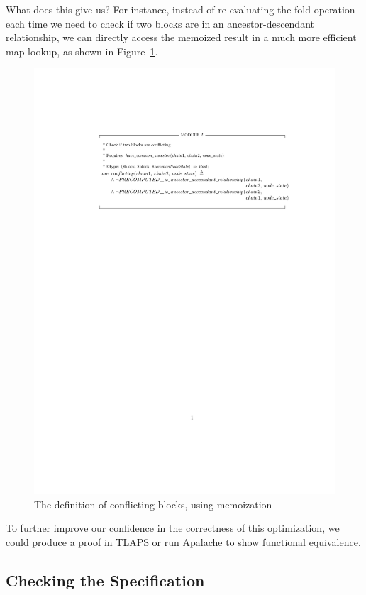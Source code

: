 What does this give us? For instance, instead of re-evaluating the fold
operation each time we need to check if two blocks are in an
ancestor-descendant relationship, we can directly access the memoized result in
a much more efficient map lookup, as shown in
Figure~\ref{fig:conflicting-memo}.

\begin{figure}[h]
  \includegraphics[width=\textwidth]{images/are_conflicting.pdf}
  \caption{The definition of conflicting blocks, using memoization}%
  \label{fig:conflicting-memo}
\end{figure}

To further improve our confidence in the correctness of this optimization, we
could produce a proof in TLAPS or run Apalache to show functional equivalence.

\subsection{Checking the Specification}

